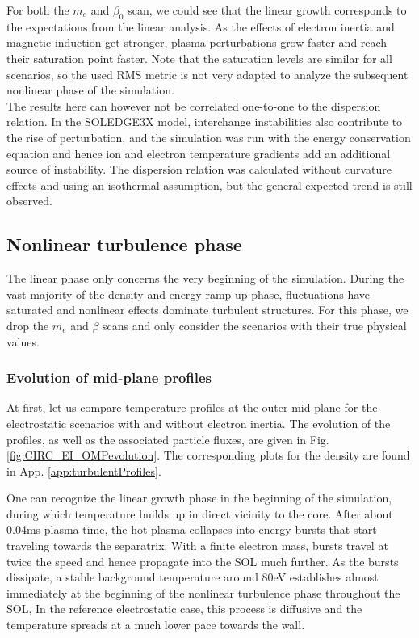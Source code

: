 For both the $m_e$ and $\beta_0$ scan, we could see that the linear growth corresponds to the expectations from the linear analysis. As the effects of electron inertia and magnetic induction get stronger, plasma perturbations grow faster and reach their saturation point faster. Note that the saturation levels are similar for all scenarios, so the used RMS metric is not very adapted to analyze the subsequent nonlinear phase of the simulation. \\

The results here can however not be correlated one-to-one to the dispersion relation. In the SOLEDGE3X model, interchange instabilities also contribute to the rise of perturbation, and the simulation was run with the energy conservation equation and hence ion and electron temperature gradients add an additional source of instability. The dispersion relation was calculated without curvature effects and using an isothermal assumption, but the general expected trend is still observed. 


\subsection{Nonlinear turbulence phase}

The linear phase only concerns the very beginning of the simulation. During the vast majority of the density and energy ramp-up phase, fluctuations have saturated and nonlinear effects dominate turbulent structures. For this phase, we drop the $m_e$ and $\beta$ scans and only consider the scenarios with their true physical values.


\subsubsection{Evolution of mid-plane profiles}

At first, let us compare temperature profiles at the outer mid-plane for the electrostatic scenarios with and without electron inertia. The evolution of the profiles, as well as the associated particle fluxes, are given in Fig. \ref{fig:CIRC_EI_OMPevolution}. The corresponding plots for the density are found in App. \ref{app:turbulentProfiles}.

One can recognize the linear growth phase in the beginning of the simulation, during which temperature builds up in direct vicinity to the core. After about 0.04ms plasma time, the hot plasma collapses into energy bursts that start traveling towards the separatrix. With a finite electron mass, bursts travel at twice the speed and hence propagate into the SOL much further. As the bursts dissipate, a stable background temperature around 80eV establishes almost immediately at the beginning of the nonlinear turbulence phase throughout the SOL, In the reference electrostatic case, this process is diffusive and the temperature spreads at a much lower pace towards the wall. 

